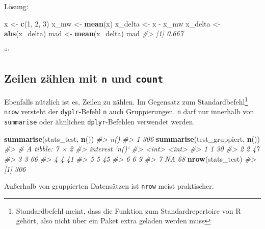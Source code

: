 \documentclass[12pt,ngerman,]{book}
\newenvironment{Shaded}{\begin{snugshade}}{\end{snugshade}}
\newcommand{\KeywordTok}[1]{\textcolor[rgb]{0.13,0.29,0.53}{\textbf{{#1}}}}
\newcommand{\DecValTok}[1]{\textcolor[rgb]{0.00,0.00,0.81}{{#1}}}
\newcommand{\StringTok}[1]{\textcolor[rgb]{0.31,0.60,0.02}{{#1}}}
\newcommand{\CommentTok}[1]{\textcolor[rgb]{0.56,0.35,0.01}{\textit{{#1}}}}
\newcommand{\NormalTok}[1]{{#1}}
\let\rmarkdownfootnote\footnote%
\def\footnote{\protect\rmarkdownfootnote}
\renewenvironment{Shaded}{\begin{kframe}}{\end{kframe}}
\begin{document}
Lösung:

\begin{Shaded}
\begin{Highlighting}[]
\NormalTok{x <-}\StringTok{ }\KeywordTok{c}\NormalTok{(}\DecValTok{1}\NormalTok{, }\DecValTok{2}\NormalTok{, }\DecValTok{3}\NormalTok{)}
\NormalTok{x_mw <-}\StringTok{ }\KeywordTok{mean}\NormalTok{(x)}
\NormalTok{x_delta <-}\StringTok{ }\NormalTok{x -}\StringTok{ }\NormalTok{x_mw}
\NormalTok{x_delta <-}\StringTok{ }\KeywordTok{abs}\NormalTok{(x_delta)}
\NormalTok{mad <-}\StringTok{ }\KeywordTok{mean}\NormalTok{(x_delta)}
\NormalTok{mad}
\CommentTok{#> [1] 0.667}
\end{Highlighting}
\end{Shaded}

```

\subsection{\texorpdfstring{Zeilen zählen mit \texttt{n} und
\texttt{count}}{Zeilen zählen mit n und count}}\label{zeilen-zahlen-mit-n-und-count}

Ebenfalls nützlich ist es, Zeilen zu zählen. Im Gegensatz zum
Standardbefehl\footnote{Standardbefehl meint, dass die Funktion zum
  Standardrepertoire von R gehört, also nicht über ein Paket extra
  geladen werden muss} \texttt{nrow} versteht der \texttt{dyplr}-Befehl
\texttt{n} auch Gruppierungen. \texttt{n} darf nur
innerhalb von \texttt{summarise} oder ähnlichen \texttt{dplyr}-Befehlen
verwendet werden.

\begin{Shaded}
\begin{Highlighting}[]
\KeywordTok{summarise}\NormalTok{(stats_test, }\KeywordTok{n}\NormalTok{())}
\CommentTok{#>   n()}
\CommentTok{#> 1 306}
\KeywordTok{summarise}\NormalTok{(test_gruppiert, }\KeywordTok{n}\NormalTok{())}
\CommentTok{#> # A tibble: 7 × 2}
\CommentTok{#>   interest `n()`}
\CommentTok{#>      <int> <int>}
\CommentTok{#> 1        1    30}
\CommentTok{#> 2        2    47}
\CommentTok{#> 3        3    66}
\CommentTok{#> 4        4    41}
\CommentTok{#> 5        5    45}
\CommentTok{#> 6        6     9}
\CommentTok{#> 7       NA    68}
\KeywordTok{nrow}\NormalTok{(stats_test)}
\CommentTok{#> [1] 306}
\end{Highlighting}
\end{Shaded}

Außerhalb von gruppierten Datensätzen ist \texttt{nrow} meist
praktischer.
\end{document}

